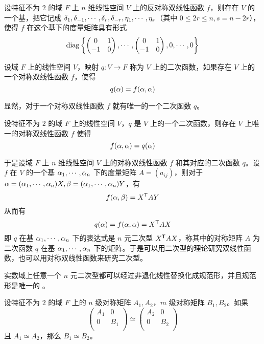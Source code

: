 \begin{theorem}
    设特征不为 $2$ 的域 $F$ 上 $n$ 维线性空间 $V$ 上的反对称双线性函数 $f$，则存在 $V$ 的一个基，把它记成 $\delta_{1},\delta_{-1},\cdots,\delta_{r},\delta_{-r},\eta_1,\cdots,\eta_s$（其中 $0 \leqslant 2r \leqslant n, s = n-2r$），使得 $f$ 在这个基下的度量矩阵具有形式
    \[ \operatorname{diag}\left\{
        \left(\begin{matrix} 0 & 1 \\ -1 & 0 \end{matrix}\right),
        \cdots,
        \left(\begin{matrix} 0 & 1 \\ -1 & 0 \end{matrix}\right),
        0,\cdots,0
    \right\} \]
\end{theorem}

\begin{definition}
    设域 $F$ 上的线性空间 $V$，映射 $q : V \to F$ 称为 $V$ 上的二次函数，如果存在 $V$ 上的一个对称双线性函数 $f$，使得
    \[ q(\alpha) = f(\alpha,\alpha) \]
\end{definition}

显然，对于一个对称双线性函数 $f$ 就有唯一的一个二次函数 $q$。

\begin{theorem}
    设特征不为 $2$ 的域 $F$ 上的线性空间 $V$，$q$ 是 $V$ 上的一个二次函数，则存在 $V$ 上唯一的对称双线性函数 $f$ 使得
    \[ f(\alpha,\alpha) = q(\alpha) \]
\end{theorem}

于是设域 $F$ 上 $n$ 维线性空间 $V$ 上的对称双线性函数 $f$ 和其对应的二次函数 $q$。设 $f$ 在 $V$ 的一个基 $\alpha_1,\cdots,\alpha_n$ 下的度量矩阵 $A = (a_{ij})$，则对于 $\alpha = (\alpha_1,\cdots,\alpha_n)X,\beta = (\alpha_1,\cdots,\alpha_n)Y$，有
\[ f(\alpha,\beta) = {X}^\mathsf{T}AY \]
从而有
\[ q(\alpha) = f(\alpha,\alpha) = {X}^\mathsf{T}AX \]
即 $q$ 在基 $\alpha_1,\cdots,\alpha_n$ 下的表达式是 $n$ 元二次型 ${X}^\mathsf{T}AX$，称其中的对称矩阵 $A$ 为二次函数 $q$ 在基 $\alpha_1,\cdots,\alpha_n$ 下的矩阵。于是可以用二次型的理论研究双线性函数，也可以用对称双线性函数来研究二次型。

\begin{theorem}[惯性定理]
    实数域上任意一个 $n$ 元二次型都可以经过非退化线性替换化成规范形，并且规范形是唯一的 。
\end{theorem}

\begin{theorem}
    设特征不为 $2$ 的域 $F$ 上的 $n$ 级对称矩阵 $A_1,A_2$，$m$ 级对称矩阵 $B_1,B_2$。如果
    \[ \left(\begin{matrix}
        A_1 & 0   \\
        0   & B_1 \\
    \end{matrix}\right) \simeq \left(\begin{matrix}
        A_2 & 0   \\
        0   & B_2 \\
    \end{matrix}\right) \]
    且 $A_1 \simeq A_2$，那么 $B_1 \simeq B_2$。
\end{theorem}

